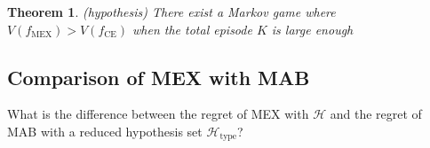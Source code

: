 \documentclass{article}
\newcommand{\tmop}[1]{\ensuremath{\operatorname{#1}}}
\newtheorem{theorem}{Theorem}
\begin{document}
\begin{theorem}
  (hypothesis) There exist a Markov game where $V (f_{\tmop{MEX}}) > V
  (f_{\tmop{CE}})$ when the total episode $K$ is large enough
\end{theorem}

\subsection{Comparison of MEX with MAB}

\begin{question}
  What is the difference between the regret of MEX with $\mathcal{H}$ and the
  regret of MAB with a reduced hypothesis set $\mathcal{H}_{\tmop{type}}$?
\end{question}


\end{document}
